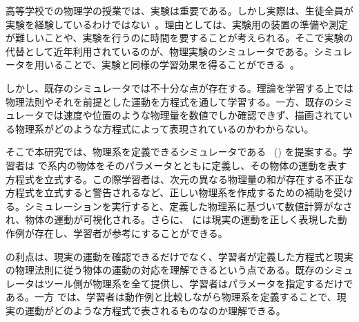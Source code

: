 高等学校での物理学の授業では、実験は重要である。しかし実際は、生徒全員が実験を経験しているわけではない~\cite{2015KJ00010038066}。理由としては、実験用の装置の準備や測定が難しいことや、実験を行うのに時間を要することが考えられる。そこで実験の代替として近年利用されているのが、物理実験のシミュレータである。シミュレータを用いることで、実験と同様の学習効果を得ることができる~\cite{ajredini_real_2014}。

しかし、既存のシミュレータでは不十分な点が存在する。理論を学習する上では物理法則やそれを前提とした運動を方程式を通して学習する。一方、既存のシミュレータでは速度や位置のような物理量を数値でしか確認できず、描画されている物理系がどのような方程式によって表現されているのかわからない。

そこで本研究では、物理系を定義できるシミュレータである \simname~(\simnamealt) を提案する。学習者は \simname で系内の物体をそのパラメータとともに定義し、その物体の運動を表す方程式を立式する。この際学習者は、次元の異なる物理量の和が存在する不正な方程式を立式すると警告されるなど、正しい物理系を作成するための補助を受ける。シミュレーションを実行すると、定義した物理系に基づいて数値計算がなされ、物体の運動が可視化される。さらに、 \simname には現実の運動を正しく表現した動作例が存在し、学習者が参考にすることができる。

\simname の利点は、現実の運動を確認できるだけでなく、学習者が定義した方程式と現実の物理法則に従う物体の運動の対応を理解できるという点である。既存のシミュレータはツール側が物理系を全て提供し、学習者はパラメータを指定するだけである。一方 \simname では、学習者は動作例と比較しながら物理系を定義することで、現実の運動がどのような方程式で表されるものなのか理解できる。